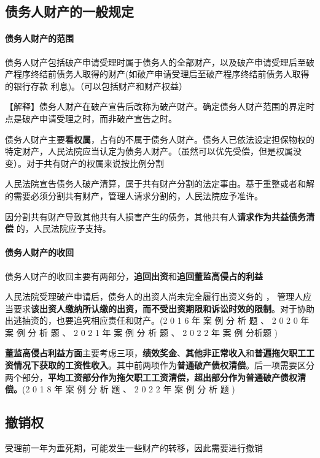 \documentclass[UTF8,12pt]{ctexart}
\numberwithin{equation}{section} %
\numberwithin{figure}{section}
\numberwithin{table}{section}
\begin{document}
	\subsection{债务人财产的一般规定}
	\paragraph{债务人财产的范围}
	
	
	债务人财产包括破产申请受理时属于债务人的全部财产，以及破产申请受理后至破产程序终结前债务人取得的财产(如破产申请受理后至破产程序终结前债务人取得的银行存款 利息)。（可以包括财产和财产权益）
	
	【解释】债务人财产在破产宣告后改称为破产财产。确定债务人财产范围的界定时点是破产申请受理之时，而非破产宣告之时。
	
	债务人财产主要\textbf{看权属}，占有的不属于债务人财产。债务人已依法设定担保物权的特定财产，人民法院应当认定为债务人财产。（虽然可以优先受偿，但是权属没变）。对于共有财产的权属来说按比例分割
	
	人民法院宣告债务人破产清算，属于共有财产分割的法定事由。基于重整或者和解的需要必须分割共有财产，管理人请求分割的，人民法院应予准许。
	
	因分割共有财产导致其他共有人损害产生的债务，其他共有人\textbf{请求作为共益债务清偿} 的，人民法院应予支持。
	
	\paragraph{债务人财产的收回}
	债务人财产的收回主要有两部分，\textbf{追回出资}和\textbf{追回董监高侵占的利益}
	
	人民法院受理破产申请后，债务人的出资人尚未完全履行出资义务的 ， 管理人应当要求\textbf{该出资人缴纳所认缴的出资，而不受出资期限和诉讼时效的限制}。对于协助出逃抽资的，也要追究相应责任和财产。(2 0 1 6 年 案 例 分 析 题 、 2 0 2 0 年 案 例 分 析 题 、 2 0 2 1 年 案 例 分 析 题 、 2 0 2 2 年 案 例 分析题 )
	
	\textbf{董监高侵占利益方面}主要考虑三项，\textbf{绩效奖金}、\textbf{其他非正常收入}和\textbf{普遍拖欠职工工资情况下获取的工资性收入}。其中前两项作为\textbf{普通破产债权清偿}。后一项需要区分两个部分，\textbf{平均工资部分作为拖欠职工工资清偿，超出部分作为普通破产债权清偿。}(2 0 1 8 年 案 例 分 析 题 、 2 0 2 2 年 案 例 分 析 题 ) 
	
	\subsection{撤销权}
	受理前一年为垂死期，可能发生一些财产的转移，因此需要进行撤销
	
\end{document}
